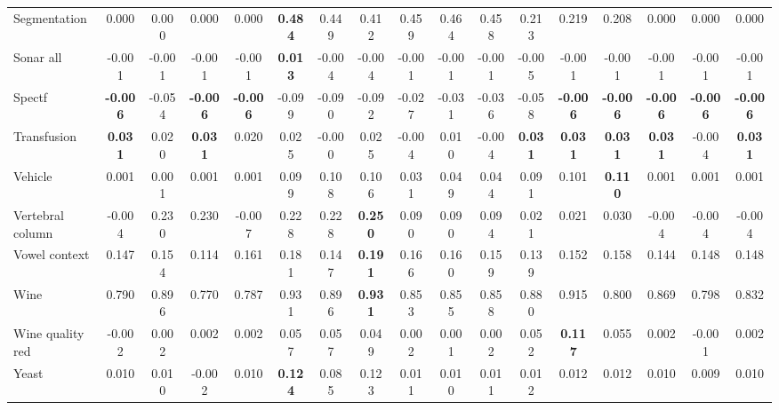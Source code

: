 \begin{tabular}{lcccccccccccccccc}
Segmentation & 0.000 & 0.000 & 0.000 & 0.000 & \textbf{0.484} & 0.449 & 0.412 & 0.459 & 0.464 & 0.458 & 0.213 & 0.219 & 0.208 & 0.000 & 0.000 & 0.000 \\
Sonar all & -0.001 & -0.001 & -0.001 & -0.001 & \textbf{0.013} & -0.004 & -0.004 & -0.001 & -0.001 & -0.001 & -0.005 & -0.001 & -0.001 & -0.001 & -0.001 & -0.001 \\
Spectf & \textbf{-0.006} & -0.054 & \textbf{-0.006} & \textbf{-0.006} & -0.099 & -0.090 & -0.092 & -0.027 & -0.031 & -0.036 & -0.058 & \textbf{-0.006} & \textbf{-0.006} & \textbf{-0.006} & \textbf{-0.006} & \textbf{-0.006} \\
Transfusion & \textbf{0.031} & 0.020 & \textbf{0.031} & 0.020 & 0.025 & -0.000 & 0.025 & -0.004 & 0.010 & -0.004 & \textbf{0.031} & \textbf{0.031} & \textbf{0.031} & \textbf{0.031} & -0.004 & \textbf{0.031} \\
Vehicle & 0.001 & 0.001 & 0.001 & 0.001 & 0.099 & 0.108 & 0.106 & 0.031 & 0.049 & 0.044 & 0.091 & 0.101 & \textbf{0.110} & 0.001 & 0.001 & 0.001 \\
Vertebral column & -0.004 & 0.230 & 0.230 & -0.007 & 0.228 & 0.228 & \textbf{0.250} & 0.090 & 0.090 & 0.094 & 0.021 & 0.021 & 0.030 & -0.004 & -0.004 & -0.004 \\
Vowel context & 0.147 & 0.154 & 0.114 & 0.161 & 0.181 & 0.147 & \textbf{0.191} & 0.166 & 0.160 & 0.159 & 0.139 & 0.152 & 0.158 & 0.144 & 0.148 & 0.148 \\
Wine & 0.790 & 0.896 & 0.770 & 0.787 & 0.931 & 0.896 & \textbf{0.931} & 0.853 & 0.855 & 0.858 & 0.880 & 0.915 & 0.800 & 0.869 & 0.798 & 0.832 \\
Wine quality red & -0.002 & 0.002 & 0.002 & 0.002 & 0.057 & 0.057 & 0.049 & 0.002 & 0.001 & 0.002 & 0.052 & \textbf{0.117} & 0.055 & 0.002 & -0.001 & 0.002 \\
Yeast & 0.010 & 0.010 & -0.002 & 0.010 & \textbf{0.124} & 0.085 & 0.123 & 0.011 & 0.010 & 0.011 & 0.012 & 0.012 & 0.012 & 0.010 & 0.009 & 0.010 \\
\bottomrule\end{tabular}
